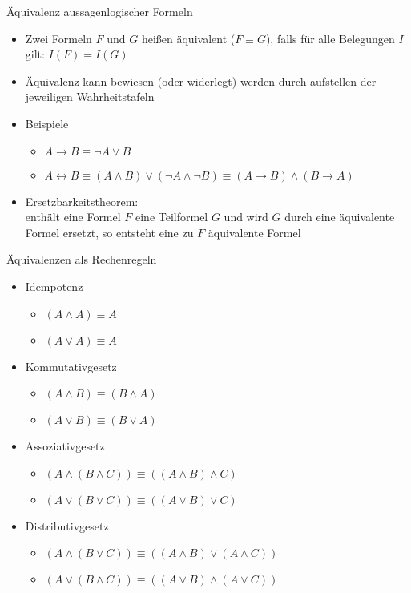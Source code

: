 \begin{frame}{Äquivalenz aussagenlogischer Formeln}
	\begin{itemize}
		\item Zwei Formeln $F$ und $G$ heißen äquivalent ($F \equiv G$), falls für alle Belegungen $I$ gilt: $I(F)=I(G)$
		\item Äquivalenz kann bewiesen (oder widerlegt) werden durch aufstellen der jeweiligen Wahrheitstafeln
		\item Beispiele
		\begin{itemize}
			\item $A \rightarrow B \equiv \neg A \lor B$
			\item $A \leftrightarrow B \equiv (A \land B) \lor (\neg A \land \neg B) \equiv (A \rightarrow B) \land (B \rightarrow A)$
		\end{itemize}
		\item Ersetzbarkeitstheorem:\\
		enthält eine Formel $F$ eine Teilformel $G$ und wird $G$ durch eine äquivalente Formel ersetzt, so entsteht eine zu $F$ äquivalente Formel
	\end{itemize}
\end{frame}

\begin{frame}{Äquivalenzen als Rechenregeln}
	\begin{itemize}
		\item Idempotenz
		\begin{itemize}
			\item $(A \land A) \equiv A$
			\item $(A \lor A) \equiv A$
		\end{itemize}
		\item Kommutativgesetz
		\begin{itemize}
			\item $(A \land B) \equiv (B \land A)$
			\item $(A \lor B) \equiv (B \lor A)$
		\end{itemize}
		\item Assoziativgesetz
		\begin{itemize}
			\item $(A \land (B \land C)) \equiv ((A \land B) \land C)$
			\item $(A \lor (B \lor C)) \equiv ((A \lor B) \lor C)$
		\end{itemize}
		\item Distributivgesetz
		\begin{itemize}
			\item $(A \land (B \lor C)) \equiv ((A \land B) \lor (A \land C))$
			\item $(A \lor (B \land C)) \equiv ((A \lor B) \land (A \lor C))$
		\end{itemize}
	\end{itemize}
\end{frame}

